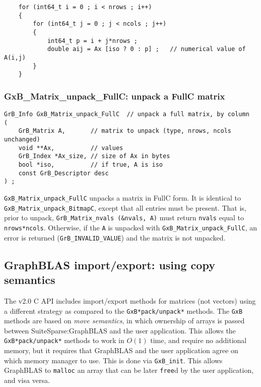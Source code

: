 \documentclass[12pt]{article}
\begin{document}
    \vspace{-0.1in}
    {\footnotesize
    \begin{verbatim}
    for (int64_t i = 0 ; i < nrows ; i++)
    {
        for (int64_t j = 0 ; j < ncols ; j++)
        {
            int64_t p = i + j*nrows ;
            double aij = Ax [iso ? 0 : p] ;   // numerical value of A(i,j)
        }
    } \end{verbatim}}

\subsubsection{{\sf GxB\_Matrix\_unpack\_FullC:} unpack a FullC matrix}
\label{matrix_unpack_fullc}

\begin{mdframed}[userdefinedwidth=6in]
{\footnotesize
\begin{verbatim}
GrB_Info GxB_Matrix_unpack_FullC  // unpack a full matrix, by column
(
    GrB_Matrix A,       // matrix to unpack (type, nrows, ncols unchanged)
    void **Ax,          // values
    GrB_Index *Ax_size, // size of Ax in bytes
    bool *iso,          // if true, A is iso
    const GrB_Descriptor desc
) ;
\end{verbatim}
} \end{mdframed}

\verb'GxB_Matrix_unpack_FullC' unpacks a matrix in FullC form.  It is identical
to \verb'GxB_Matrix_unpack_BitmapC', except that all entries must be present.
That is, prior to unpack, \verb'GrB_Matrix_nvals (&nvals, A)' must return
\verb'nvals' equal to \verb'nrows*ncols'.  Otherwise, if the \verb'A' is
unpacked with \newline \verb'GxB_Matrix_unpack_FullC', an error is returned
(\verb'GrB_INVALID_VALUE') and the matrix is not unpacked.

\newpage
\subsection{GraphBLAS import/export: using copy semantics} %
\label{GrB_import_export}

The v2.0 C API includes import/export methods for matrices (not vectors) using
a different strategy as compared to the \verb'GxB*pack/unpack*' methods.  The
\verb'GxB' methods are based on {\em move semantics}, in which ownership of
arrays is passed between SuiteSparse:GraphBLAS and the user application.  This
allows the \verb'GxB*pack/unpack*' methods to work in $O(1)$ time, and require
no additional memory, but it requires that GraphBLAS and the user application
agree on which memory manager to use.  This is done via \verb'GxB_init'.  This
allows GraphBLAS to \verb'malloc' an array that can be later \verb'free'd by
the user application, and visa versa.
\end{document}
